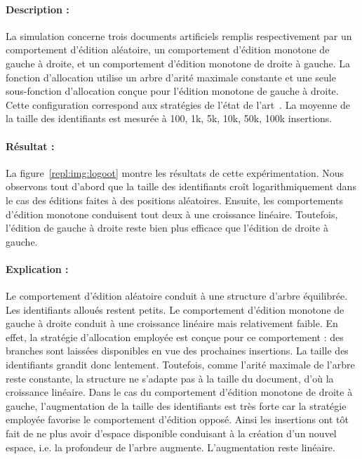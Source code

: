 \paragraph{Description :} La simulation concerne trois documents artificiels
remplis respectivement par un comportement d'édition aléatoire, un comportement
d'édition monotone de gauche à droite, et un comportement d'édition monotone de
droite à gauche. La fonction d'allocation utilise un arbre d'arité maximale
constante et une seule sous-fonction d'allocation conçue pour l'édition monotone
de gauche à droite. Cette configuration correspond aux stratégies de l'état de
l'art~\cite{preguica2009commutative, weiss2009logoot}.  La moyenne de la taille
des identifiants est mesurée à 100, 1k, 5k, 10k, 50k, 100k insertions.

\paragraph{Résultat :} La figure~\ref{repl:img:logoot} montre les résultats de
cette expérimentation. Nous observons tout d'abord que la taille des
identifiants croît logarithmiquement dans le cas des éditions faites à des
positions aléatoires. Ensuite, les comportements d'édition monotone conduisent
tout deux à une croissance linéaire. Toutefois, l'édition de gauche à droite
reste bien plus efficace que l'édition de droite à gauche.

\paragraph{Explication :} Le comportement d'édition aléatoire conduit à une
structure d'arbre équilibrée. Les identifiants alloués restent petits. Le
comportement d'édition monotone de gauche à droite conduit à une croissance
linéaire mais relativement faible. En effet, la stratégie d'allocation employée
est conçue pour ce comportement : des branches sont laissées disponibles en vue
des prochaines insertions. La taille des identifiants grandit donc
lentement. Toutefois, comme l'arité maximale de l'arbre reste constante, la
structure ne s'adapte pas à la taille du document, d'où la croissance
linéaire. Dans le cas du comportement d'édition monotone de droite à gauche,
l'augmentation de la taille des identifiants est très forte car la stratégie
employée favorise le comportement d'édition opposé. Ainsi les insertions ont tôt
fait de ne plus avoir d'espace disponible conduisant à la création d'un nouvel
espace, i.e. la profondeur de l'arbre augmente. L'augmentation reste linéaire.

